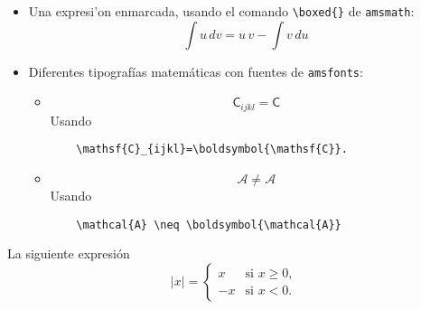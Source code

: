 \documentclass[11pt]{exam}
\begin{document}
\begin{questions}
\begin{itemize}
\begin{verbatim}
	\begin{align} 
	 ... &= ...\\
	 ... &= ...\\
	 ... &= ...
	\end{align} 
\end{verbatim}

\item Una expresi'on enmarcada, usando el comando \verb|\boxed{}| de \texttt{amsmath}:
\newline
\begin{equation*}
\boxed{\int u \, dv=u\,v-\int v \, du}
\end{equation*}

\item Diferentes tipografías matem\'aticas con fuentes de \texttt{amsfonts}:
\begin{itemize}
\item 
\begin{equation}
\mathsf{C}_{ijkl}=\boldsymbol{\mathsf{C}}
\end{equation}
Usando

\begin{verbatim}
	\mathsf{C}_{ijkl}=\boldsymbol{\mathsf{C}}.
\end{verbatim}

\item 
\begin{equation}
\mathcal{A} \neq \boldsymbol{\mathcal{A}}
\end{equation}
Usando

\begin{verbatim}
	\mathcal{A} \neq \boldsymbol{\mathcal{A}}
\end{verbatim}


\end{itemize}
\end{itemize}
\item La siguiente expresi\'on
\begin{equation}
 |x| = \left\{ \begin{array}{ll}
         x & \mbox{si $x \geq 0$},\\
        -x & \mbox{si $x < 0$}.\end{array} \right.
\end{equation}


\end{questions}
\end{document}
